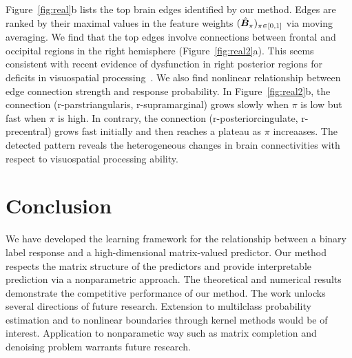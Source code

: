 \documentclass[11pt]{article}
\theoremstyle{definition}
\begin{document}
Figure~\ref{fig:real}b lists the top brain edges identified by our method. Edges are ranked by their maximal values in the feature weights $(\hat {\bm B}_\pi)_{\pi \in [0,1]}$ via moving averaging. We find that the top edges involve connections between frontal and occipital regions in the right hemisphere (Figure~\ref{fig:real2}a). This seems consistent with recent evidence of dysfunction in right posterior regions for deficits in visuospatial processing~\citep{wang2019common}. We also find nonlinear relationship between edge connection strength and response probability. In Figure~\ref{fig:real2}b, the connection (r-parstriangularis, r-supramarginal) grows slowly when $\pi$ is low but fast when $\pi$ is high. In contrary, the connection (r-posteriorcingulate, r-precentral) grows fast initially and then reaches a plateau as $\pi$ increaases. The detected pattern reveals the heterogeneous changes in brain connectivities with respect to visuospatial processing ability. 




\section{Conclusion}
We have developed the learning framework for the relationship between a binary label response and a high-dimensional matrix-valued predictor. 
Our method respects the matrix structure of the predictors and provide interpretable prediction via a nonparametric approach. 
The theoretical and numerical results demonstrate the competitive performance of our method.
The work unlocks several directions of future research. Extension to multilclass probability estimation and to nonlinear boundaries through kernel methods would be of interest. Application to nonparametic way such as matrix completion and denoising problem warrants future research.





\end{document}

